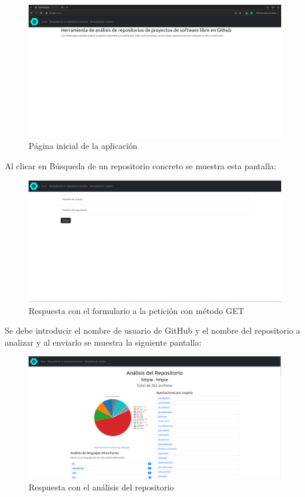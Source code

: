 \documentclass[a4paper, 12pt]{book}
\begin{document}
\begin{figure}[H]
  \centering
  \includegraphics[width=1\textwidth]{img/paginaprincipal.png}
  \caption{Página inicial de la aplicación}
  \label{figura:appmainpage2}
\end{figure}

  Al clicar en Búsqueda de un repositorio concreto se muestra esta pantalla:

  \begin{figure}[H]
    \centering
    \includegraphics[width=1\textwidth]{img/userrepoget.png}
    \caption{Respuesta con el formulario a la petición con método GET}
    \label{figura:userrepoget2}
  \end{figure}

  Se debe introducir el nombre de usuario de GitHub y el nombre del repositorio a analizar y al enviarlo se muestra la siguiente pantalla:
  \begin{figure}[H]
    \centering
    \includegraphics[width=1\textwidth]{img/httpie.png}
    \caption{Respuesta con el análisis del repositorio}
    \label{figura:httpie}
  \end{figure}
\end{document}
